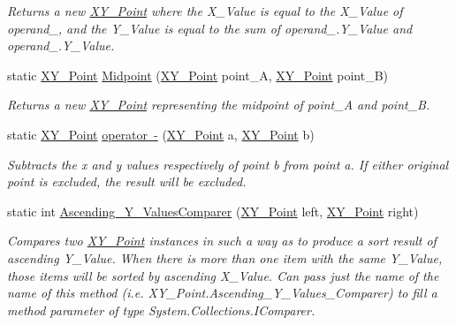 \begin{DoxyCompactItemize}
\begin{DoxyCompactList}\small\item\em Returns a new \mbox{\hyperlink{struct_c_s_i_1_1_library_1_1_data_types_1_1_x_y___point}{X\+Y\+\_\+\+Point}} where the X\+\_\+\+Value is equal to the X\+\_\+\+Value of operand\+\_, and the Y\+\_\+\+Value is equal to the sum of operand\+\_.\+Y\+\_\+\+Value and operand\+\_.\+Y\+\_\+\+Value. \end{DoxyCompactList}\item 
static \mbox{\hyperlink{struct_c_s_i_1_1_library_1_1_data_types_1_1_x_y___point}{X\+Y\+\_\+\+Point}} \mbox{\hyperlink{struct_c_s_i_1_1_library_1_1_data_types_1_1_x_y___point_adae695175aa2738a5e0b4e06cc010caf}{Midpoint}} (\mbox{\hyperlink{struct_c_s_i_1_1_library_1_1_data_types_1_1_x_y___point}{X\+Y\+\_\+\+Point}} point\+\_\+A, \mbox{\hyperlink{struct_c_s_i_1_1_library_1_1_data_types_1_1_x_y___point}{X\+Y\+\_\+\+Point}} point\+\_\+B)
\begin{DoxyCompactList}\small\item\em Returns a new \mbox{\hyperlink{struct_c_s_i_1_1_library_1_1_data_types_1_1_x_y___point}{X\+Y\+\_\+\+Point}} representing the midpoint of point\+\_\+A and point\+\_\+B. \end{DoxyCompactList}\item 
static \mbox{\hyperlink{struct_c_s_i_1_1_library_1_1_data_types_1_1_x_y___point}{X\+Y\+\_\+\+Point}} \mbox{\hyperlink{struct_c_s_i_1_1_library_1_1_data_types_1_1_x_y___point_abc78d9c8ed6eab0d191d51613010aa13}{operator -\/}} (\mbox{\hyperlink{struct_c_s_i_1_1_library_1_1_data_types_1_1_x_y___point}{X\+Y\+\_\+\+Point}} a, \mbox{\hyperlink{struct_c_s_i_1_1_library_1_1_data_types_1_1_x_y___point}{X\+Y\+\_\+\+Point}} b)
\begin{DoxyCompactList}\small\item\em Subtracts the x and y values respectively of point b from point a. If either original point is excluded, the result will be excluded. \end{DoxyCompactList}\item 
static int \mbox{\hyperlink{struct_c_s_i_1_1_library_1_1_data_types_1_1_x_y___point_ab6b36557c1c1ae436ca04c0522ab850b}{Ascending\+\_\+\+Y\+\_\+\+Values\+Comparer}} (\mbox{\hyperlink{struct_c_s_i_1_1_library_1_1_data_types_1_1_x_y___point}{X\+Y\+\_\+\+Point}} left, \mbox{\hyperlink{struct_c_s_i_1_1_library_1_1_data_types_1_1_x_y___point}{X\+Y\+\_\+\+Point}} right)
\begin{DoxyCompactList}\small\item\em Compares two \mbox{\hyperlink{struct_c_s_i_1_1_library_1_1_data_types_1_1_x_y___point}{X\+Y\+\_\+\+Point}} instances in such a way as to produce a sort result of ascending Y\+\_\+\+Value. When there is more than one item with the same Y\+\_\+\+Value, those items will be sorted by ascending X\+\_\+\+Value. Can pass just the name of the name of this method (i.\+e. X\+Y\+\_\+\+Point.\+Ascending\+\_\+\+Y\+\_\+\+Values\+\_\+\+Comparer) to fill a method parameter of type System.\+Collections.\+I\+Comparer. \end{DoxyCompactList}\item 

\end{DoxyCompactItemize}
